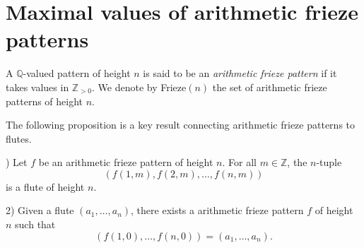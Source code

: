 \chapter{Maximal values of arithmetic frieze patterns}\label{s:arith_fp}
\begin{definition}
    \label{def:arith_fp}
    \leanok
        A $\mathbb{Q}$-valued pattern of height $n$ is said to be an \textit{arithmetic frieze pattern} if it takes 
        values in $\mathbb{Z}_{>0}$. 
        We denote by Frieze$(n)$ the set of arithmetic frieze patterns of height $n$. 
\end{definition}

The following proposition is a key result connecting arithmetic frieze patterns to flutes.
\begin{proposition}
    \label{prop:friezeIffFlute}
    ) Let $f$ be an arithmetic frieze pattern of height $n$. For all $m \in \mathbb{Z}$, the $n$-tuple
\[
    (f (1,m), f (2,m), \ldots, f (n,m))
\]
is a flute of height $n$.

2) Given a flute $(a_1, \ldots, a_n)$, there exists a arithmetic frieze pattern $f$ of height $n$ such that
\[
    (f (1,0), \ldots, f (n,0)) = (a_1, \ldots, a_n).
\]
\end{proposition}
